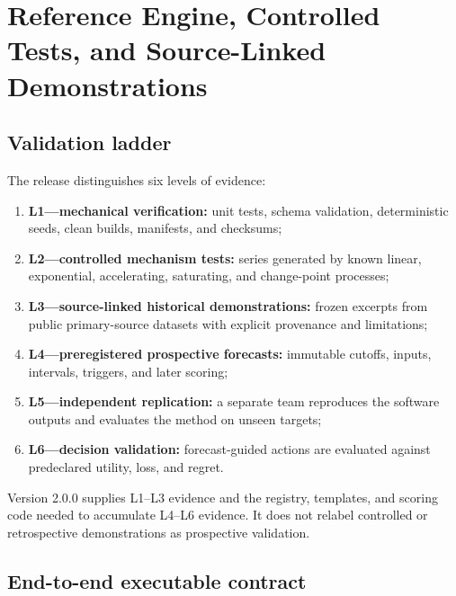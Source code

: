\section{Reference Engine, Controlled Tests, and Source-Linked Demonstrations}

\subsection{Validation ladder}

The release distinguishes six levels of evidence:
\begin{enumerate}
\item \textbf{L1---mechanical verification:} unit tests, schema validation, deterministic seeds, clean builds, manifests, and checksums;
\item \textbf{L2---controlled mechanism tests:} series generated by known linear, exponential, accelerating, saturating, and change-point processes;
\item \textbf{L3---source-linked historical demonstrations:} frozen excerpts from public primary-source datasets with explicit provenance and limitations;
\item \textbf{L4---preregistered prospective forecasts:} immutable cutoffs, inputs, intervals, triggers, and later scoring;
\item \textbf{L5---independent replication:} a separate team reproduces the software outputs and evaluates the method on unseen targets;
\item \textbf{L6---decision validation:} forecast-guided actions are evaluated against predeclared utility, loss, and regret.
\end{enumerate}
Version 2.0.0 supplies L1--L3 evidence and the registry, templates, and scoring code needed to accumulate L4--L6 evidence. It does not relabel controlled or retrospective demonstrations as prospective validation.

\subsection{End-to-end executable contract}


